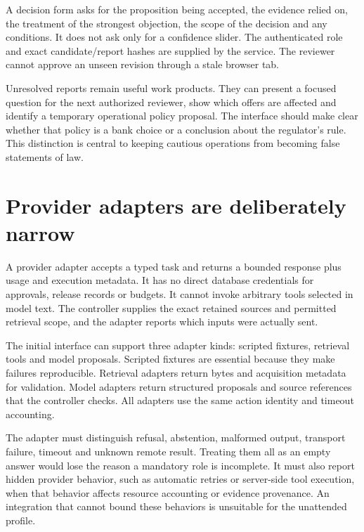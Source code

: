 \documentclass[12pt,a4paper,oneside,openany]{book}
\begin{document}
A decision form asks for the proposition being accepted, the evidence relied on,
the treatment of the strongest objection, the scope of the decision and any
conditions. It does not ask only for a confidence slider. The authenticated role
and exact candidate/report hashes are supplied by the service. The reviewer
cannot approve an unseen revision through a stale browser tab.

Unresolved reports remain useful work products. They can present a focused
question for the next authorized reviewer, show which offers are affected and
identify a temporary operational policy proposal. The interface should make clear
whether that policy is a bank choice or a conclusion about the regulator's rule.
This distinction is central to keeping cautious operations from becoming false
statements of law.

\section{Provider adapters are deliberately narrow}
\label{merge:M08:09}


A provider adapter accepts a typed task and returns a bounded response plus usage
and execution metadata. It has no direct database credentials for approvals,
release records or budgets. It cannot invoke arbitrary tools selected in model
text. The controller supplies the exact retained sources and permitted retrieval
scope, and the adapter reports which inputs were actually sent.

The initial interface can support three adapter kinds: scripted fixtures,
retrieval tools and model proposals. Scripted fixtures are essential because they
make failures reproducible. Retrieval adapters return bytes and acquisition
metadata for validation. Model adapters return structured proposals and source
references that the controller checks. All adapters use the same action identity
and timeout accounting.

The adapter must distinguish refusal, abstention, malformed output, transport
failure, timeout and unknown remote result. Treating them all as an empty answer
would lose the reason a mandatory role is incomplete. It must also report hidden
provider behavior, such as automatic retries or server-side tool execution, when
that behavior affects resource accounting or evidence provenance. An integration
that cannot bound these behaviors is unsuitable for the unattended profile.
\end{document}
